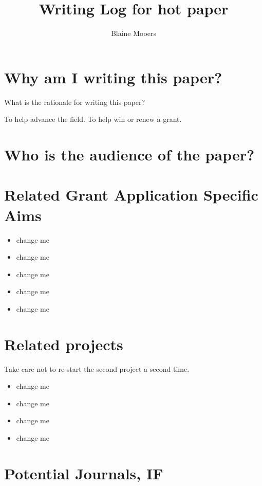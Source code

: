 \documentclass[10pt,letterpaper]{article}
\title{Writing Log for hot paper}
\author{Blaine Mooers}
\begin{document}
\maketitle

\section{Why am I writing this paper?}

What is the rationale for writing this paper?

To help advance the field. To help win or renew a grant.


\section{Who is the audience of the paper?}


\section{Related Grant Application Specific Aims}

\begin{itemize}
\item change me
\item change me
\item change me
\item change me
\item change me
\end{itemize}

\section{Related projects}

Take care not to re-start the second project a second time.

  \begin{itemize}
  \item change me
  \item change me
  \item change me
  \item change me
  \end{itemize}


\section{Potential Journals, IF}
\end{document}
